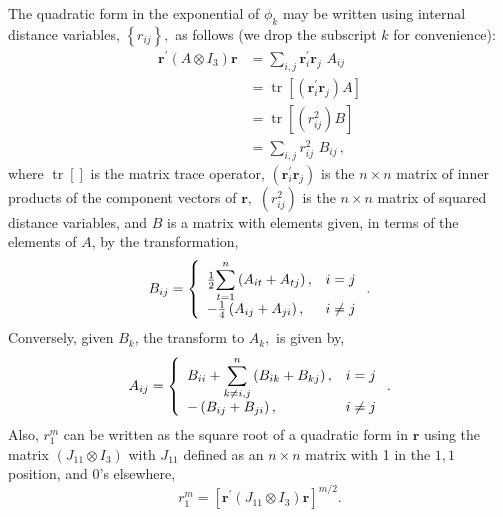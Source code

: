 \documentclass[12pt]{article}
\begin{document}
The quadratic form in the exponential of $\phi_{k}$ may be written using
internal distance variables, $\left\{  r_{ij}\right\}  ,$ as follows (we drop
the subscript $k$ for convenience):
\begin{align}
\mathbf{r}^{\prime}(A\otimes I_{3})\mathbf{r} &  =\sum_{i,j}\mathbf{r}%
_{i}^{\prime}\mathbf{r}_{j}\,\,A_{ij}\\
&  =\operatorname{tr}\left[  \left(  \mathbf{r}_{i}^{\prime}\mathbf{r}%
_{j}\right)  A\right]  \\
&  =\operatorname{tr}\left[  \left(  r_{ij}^{2}\right)  B\right]  \\
&  =\sum_{i,j}r_{ij}^{2}\,\,B_{ij}\,,
\end{align}
where $\operatorname{tr}\left[  {}\right]  $ is the matrix trace operator,
$\left(  \mathbf{r}_{i}^{\prime}\mathbf{r}_{j}\right)  $ is the $n\times n$
matrix of inner products of the component vectors of $\mathbf{r},$ $\left(
r_{ij}^{2}\right)  $ is the $n\times n$ matrix of squared distance variables,
and $B$ is a matrix with elements given, in terms of the elements of $A$, by
the transformation,
\begin{equation}
B_{ij}=\left\{
\begin{array}
[c]{ll}%
\frac{1}{2}%
{\displaystyle\sum\limits_{t=1}^{n}}
\left(  A_{it}+A_{tj}\right)  , & i=j\\
-\frac{1}{4}\left(  A_{ij}+A_{ji}\right)  , & i\neq j
\end{array}
\right.  .\label{Btran}%
\end{equation}
Conversely, given $B_{k}$, the transform to $A_{k},$ is given by,
\begin{equation}
A_{ij}=\left\{
\begin{array}
[c]{ll}%
B_{ii}+%
{\displaystyle\sum\limits_{k\neq i,j}^{n}}
\left(  B_{ik}+B_{kj}\right)  , & i=j\\
-\left(  B_{ij}+B_{ji}\right)  , & i\neq j
\end{array}
\right.  .\label{Atran}%
\end{equation}
Also, $r_{1}^{m}$ can be written as the square root of a quadratic form in
$\mathbf{r}$ using the matrix $\left(  J_{11}\otimes I_{3}\right)  $ with
$J_{11}$ defined as an $n\times n$ matrix with 1 in the $1,1$ position, and
0's elsewhere\cite{Poshusta83,Kinghorn95a},
\begin{equation}
r_{1}^{m}=\left[  \mathbf{r}^{\prime}(J_{11}\otimes I_{3})\mathbf{r}\right]
^{m/2}.\label{rijJ}%
\end{equation}
\end{document}
